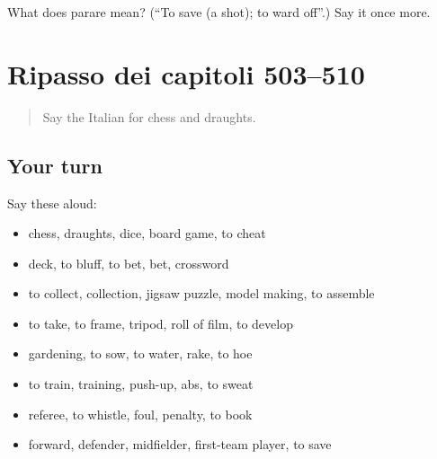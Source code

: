 \begin{tcolorbox}[breakable,colback=teal!4,colframe=teal!35!black,title={Before you move on}]
What does parare mean? (\textquotedblleft{}To save (a shot); to ward off\textquotedblright{}.) Say it once more.
\end{tcolorbox}
\section[(dialogue)]{Ripasso dei capitoli 503–510}

\label{lesson:IT-R510-ripasso-503-510}



\begin{quote}
Say the Italian for chess and draughts.
\end{quote}

\subsection*{Your turn}
Say these aloud:

\begin{itemize}
\raggedright
  \item chess, draughts, dice, board game, to cheat
  \item deck, to bluff, to bet, bet, crossword
  \item to collect, collection, jigsaw puzzle, model making, to assemble
  \item to take, to frame, tripod, roll of film, to develop
  \item gardening, to sow, to water, rake, to hoe
  \item to train, training, push-up, abs, to sweat
  \item referee, to whistle, foul, penalty, to book
  \item forward, defender, midfielder, first-team player, to save
\end{itemize}

